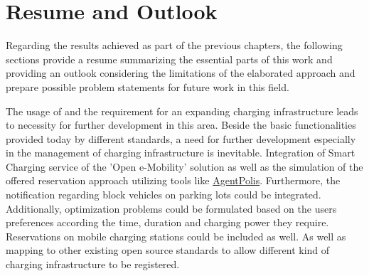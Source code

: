 

\chapter{Resume and Outlook}
\label{ch:Resume and Outlook}

Regarding the results achieved as part of the previous chapters, the following sections provide a resume summarizing the essential parts of this work and providing an outlook considering the limitations of the elaborated approach and prepare possible problem statements for future work in this field.

The usage of  and the requirement for an expanding charging infrastructure leads to necessity for further development in this area. Beside the basic functionalities provided today by different standards, a need for further development especially in the management of charging infrastructure is inevitable. 
Integration of Smart Charging service of the 'Open e-Mobility' solution as well as the simulation of the offered reservation approach utilizing tools like \href{https://github.com/aicenter/agentpolis}{AgentPolis}.
Furthermore, the notification regarding block vehicles on  parking lots could be integrated.
Additionally, optimization problems could be formulated based on the users preferences according the time, duration and charging power they require.
Reservations on mobile charging stations could be included as well.
As well as mapping to other existing open source standards to allow different kind of charging infrastructure to be registered.